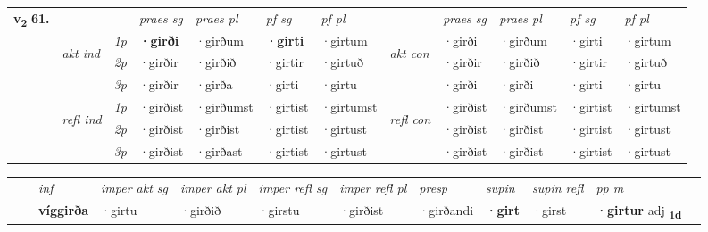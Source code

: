 \begin{tabular}{llllllllllll} \toprule
\multirow{4}{*}{{{\textbf{v{\textsubscript{2}}} \Large{\textbf{61.}}}}}  & &   &  \textit{praes sg}  & \textit{praes pl}  &\textit{ pf sg} & \textit{pf pl} &  &  \textit{praes sg}  & \textit{praes pl}  & \textit{pf sg} & \textit{pf pl } \\*
	\cmidrule{4-7} \cmidrule{9-12}
 & \multirow{3}{*}{\begin{turn}{90}\textit{akt ind}\end{turn}} & {\textit{1p}} & \textbf{·girði} & ·girðum    & \textbf{·girti} & ·girtum & \multirow{3}{*}{\begin{turn}{90}\textit{akt con}\end{turn}} &·girði & ·girðum & ·girti & ·girtum\\*
& &  {\textit{2p}} &  ·girðir  & ·girðið   & ·girtir & ·girtuð & & ·girðir & ·girðið & ·girtir & ·girtuð \\*
& &  {\textit{3p}} & ·girðir & ·girða   & ·girti & ·girtu & & ·girði & ·girði& ·girti & ·girtu  \\*
\cmidrule{4-7} \cmidrule{9-12}
 &\multirow{3}{*}{\begin{turn}{90}\textit{refl ind}\end{turn}} & {\textit{1p}} & ·girðist & ·girðumst    & ·girtist & ·girtumst & \multirow{3}{*}{\begin{turn}{90}\textit{refl con}\end{turn}}  &·girðist & ·girðumst & ·girtist & ·girtumst\\*
 &&  {\textit{2p}} &  ·girðist  & ·girðist   & ·girtist & ·girtust & &·girðist & ·girðist & ·girtist & ·girtust \\*
& &  {\textit{3p}} & ·girðist & ·girðast   & ·girtist & ·girtust & & ·girðist & ·girðist& ·girtist & ·girtust  \\*
\cmidrule{4-7} \cmidrule{9-12}
\end{tabular}


\begin{tabular}{llllllllllll}
 & & \textit{inf} & \textit{imper akt sg} & \textit{imper akt pl} & \textit{imper refl sg} & \textit{imper refl pl} & \textit{presp} & \textit{supin} & \textit{supin refl} & \textit{pp m}     \\*
  & & \textbf{víggirða} & ·girtu  & ·girðið & ·girstu & ·girðist & ·girðandi &  \textbf{·girt} & ·girst & \textbf{·girtur} adj \textbf{\textsubscript{1d}} \\*
\cmidrule{1-12}
\end{tabular}




